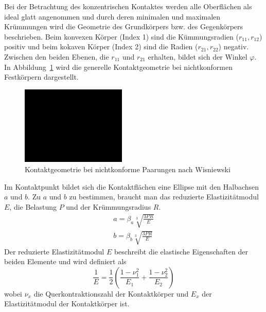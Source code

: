 Bei der Betrachtung des konzentrischen Kontaktes werden alle Oberflächen als ideal glatt angenommen und durch deren minimalen und maximalen Krümmungen wird die Geometrie des Grundkörpers bzw. des Gegenkörpers beschrieben.
Beim konvexen Körper (Index 1) sind die Kümmungsradien ($r_{11}, r_{12}$) positiv und beim kokaven Körper (Index 2) sind die Radien ($r_{21}, r_{22}$) negativ.
Zwischen den beiden Ebenen, die $r_{11}$ und $r_{21}$ erhalten, bildet sich der Winkel $\varphi$.
In Abbildung~\ref{fig:kontaktgeometrie_nichtkonforme_kontakte} wird die generelle Kontaktgeometrie bei nichtkonformen Festkörpern dargestellt.
\begin{figure}[htb]
    \centering
    \includegraphics[width=5cm]{./images/blank_img.jpg}
    \caption{Kontaktgeometrie bei nichtkonforme Paarungen nach Wisniewski}
    \label{fig:kontaktgeometrie_nichtkonforme_kontakte}
\end{figure}
%
Im Kontaktpunkt bildet sich die Kontaktflächen eine Ellipse mit den Halbachsen $a$ und $b$.
Zu $a$ und $b$ zu bestimmen, braucht man das reduzierte Elastizitätmodul $E$, die Belastung $P$ und der Krümmungsradius $R$.
\begin{align}
    a = \beta_a  \sqrt[3]{\frac{3  P  R}{E}} \label{eq:laenge_a} \\
    b = \beta_b  \sqrt[3]{\frac{3  P  R}{E}} \label{eq:laenge_b}
\end{align}
%
Der reduzierte Elastizitätmodul $E$ beschreibt die elastische Eigenschaften der beiden Elemente und wird definiert als
\begin{equation}
    \label{eq:reduzierter_elastizitaetsmodul}
    \frac{1}{E} = \frac{1}{2}  \left( \frac{1 - \nu_1^2}{E_1} + \frac{1 - \nu_2^2}{E_2} \right)
\end{equation}
%
wobei $\nu_x$ die Querkontraktionszahl der Kontaktkörper und $E_x$ der Elastizitätmodul der Kontaktkörper ist.
